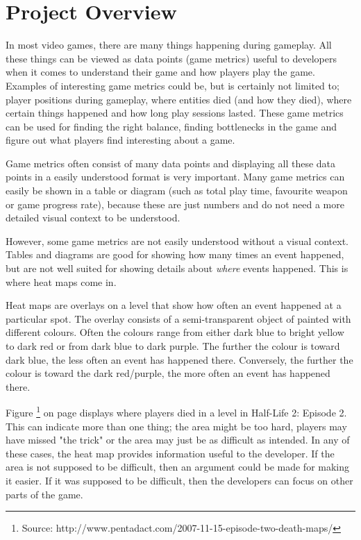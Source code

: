 \section{Project Overview}
\label{PO}
In most video games, there are many things happening during gameplay. All these things can be viewed as data points (game metrics) useful to developers when it comes to understand their game and how players play the game. Examples of interesting game metrics could be, but is certainly not limited to; player positions during gameplay, where entities died (and how they died), where certain things happened and how long play sessions lasted. These game metrics can be used for finding the right balance, finding bottlenecks in the game and figure out what players find interesting about a game.

Game metrics often consist of many data points and displaying all these data points in a easily understood format is very important. Many game metrics can easily be shown in a table or diagram (such as total play time, favourite weapon or game progress rate), because these are just numbers and do not need a more detailed visual context to be understood.

However, some game metrics are not easily understood without a visual context. Tables and diagrams are good for showing how many times an event happened, but are not well suited for showing details about \textit{where} events happened. This is where heat maps come in. 


Heat maps are overlays on a level that show how often an event happened at a particular spot. The overlay consists of a semi-transparent object of painted with different colours. Often the colours range from either dark blue to bright yellow to dark red or from dark blue to dark purple. The further the colour is toward dark blue, the less often an event has happened there. Conversely, the further the colour is toward the dark red/purple, the more often an event has happened there. 

Figure \footnote{Source: http://www.pentadact.com/2007-11-15-episode-two-death-maps/} on page \pageref{fig:HL_2_HeatMap} displays where players died in a level in Half-Life 2: Episode 2. This can indicate more than one thing; the area might be too hard, players may have missed "the trick" or the area may just be as difficult as intended. In any of these cases, the heat map provides information useful to the developer. If the area is not supposed to be difficult, then an argument could be made for making it easier. If it was supposed to be difficult, then the developers can focus on other parts of the game.

